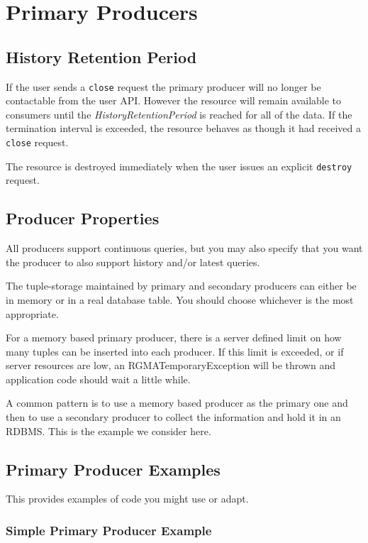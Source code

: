 \section{Primary Producers}
\label{sec:primaryp}

\subsection{History Retention Period}

If the user sends a \texttt{close} request the primary producer will
no longer be contactable from the user API. However the resource will
remain available to consumers until the \emph{HistoryRetentionPeriod}
is reached for all of the data. If the termination interval is
exceeded, the resource behaves as though it had received a
\texttt{close} request.

The resource is destroyed immediately when the user issues an explicit
\texttt{destroy} request.

\subsection{Producer Properties}
All producers support continuous queries, but you may also specify
that you want the producer to also support history and/or latest
queries.

The tuple-storage maintained by primary and secondary producers can
either be in memory or in a real database table. You should choose
whichever is the most appropriate.

For a memory based primary producer, there is a server defined limit
on how many tuples can be inserted into each producer. If this limit
is exceeded, or if server resources are low, an RGMATemporaryException
will be thrown and application code should wait a little while.

A common pattern is to use a memory based producer as the primary one
and then to use a secondary producer to collect the information and hold it in
an RDBMS. This is the example we consider here.

\subsection{Primary Producer Examples}
This provides examples of code you might use or adapt.
\subsubsection{Simple Primary Producer Example}
